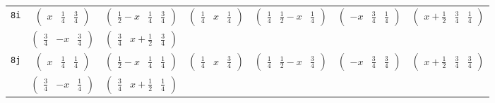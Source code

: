\documentclass[fleqn,9pt,landscape]{jsarticle}
\begin{document}
\begin{center}
\begin{longtable}{ccccccc}
{\tt 8i} & $ \begin{pmatrix} x & \frac{1}{4} & \frac{3}{4} \end{pmatrix} $ & $ \begin{pmatrix} \frac{1}{2} - x & \frac{1}{4} & \frac{3}{4} \end{pmatrix} $ & $ \begin{pmatrix} \frac{1}{4} & x & \frac{1}{4} \end{pmatrix} $ & $ \begin{pmatrix} \frac{1}{4} & \frac{1}{2} - x & \frac{1}{4} \end{pmatrix} $ & $ \begin{pmatrix} - x & \frac{3}{4} & \frac{1}{4} \end{pmatrix} $ & $ \begin{pmatrix} x + \frac{1}{2} & \frac{3}{4} & \frac{1}{4} \end{pmatrix} $ \\
& $ \begin{pmatrix} \frac{3}{4} & - x & \frac{3}{4} \end{pmatrix} $ & $ \begin{pmatrix} \frac{3}{4} & x + \frac{1}{2} & \frac{3}{4} \end{pmatrix} $ & $  $ & $  $ & $  $ & $  $ \\ \hline
{\tt 8j} & $ \begin{pmatrix} x & \frac{1}{4} & \frac{1}{4} \end{pmatrix} $ & $ \begin{pmatrix} \frac{1}{2} - x & \frac{1}{4} & \frac{1}{4} \end{pmatrix} $ & $ \begin{pmatrix} \frac{1}{4} & x & \frac{3}{4} \end{pmatrix} $ & $ \begin{pmatrix} \frac{1}{4} & \frac{1}{2} - x & \frac{3}{4} \end{pmatrix} $ & $ \begin{pmatrix} - x & \frac{3}{4} & \frac{3}{4} \end{pmatrix} $ & $ \begin{pmatrix} x + \frac{1}{2} & \frac{3}{4} & \frac{3}{4} \end{pmatrix} $ \\
& $ \begin{pmatrix} \frac{3}{4} & - x & \frac{1}{4} \end{pmatrix} $ & $ \begin{pmatrix} \frac{3}{4} & x + \frac{1}{2} & \frac{1}{4} \end{pmatrix} $ & $  $ & $  $ & $  $ & $  $ \\ \hline

\end{longtable}
\end{center}
\end{document}
